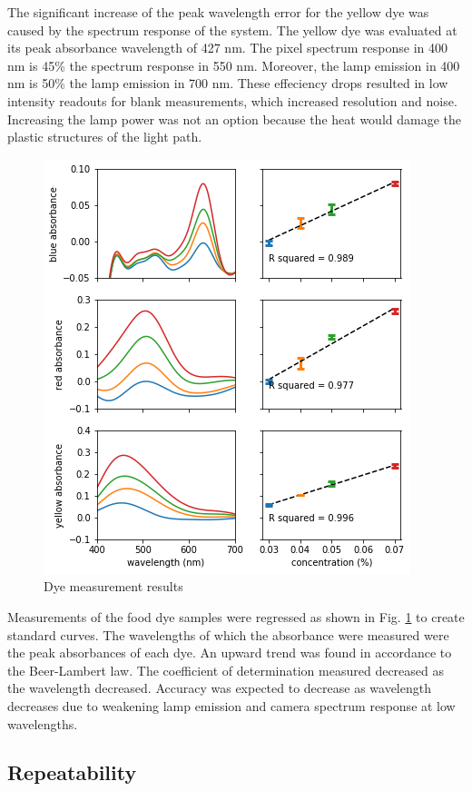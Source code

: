 \documentclass[conference]{IEEEtran}
\begin{document}
The significant increase of the peak wavelength error for the yellow dye was caused by the spectrum response of the system.
The yellow dye was evaluated at its peak absorbance wavelength of 427 nm.
The pixel spectrum response in 400 nm is 45\% the spectrum response in 550 nm.
Moreover, the lamp emission in 400 nm is 50\% the lamp emission in 700 nm.
These effeciency drops resulted in low intensity readouts for blank measurements, which increased resolution and noise.
Increasing the lamp power was not an option because the heat would damage the plastic structures of the light path. 

\begin{figure}[htbp]
    \centerline{\includegraphics[scale=0.6]{dye-res.png}}

    \caption{Dye measurement results}
    \label{dye_res}
    \end{figure}

Measurements of the food dye samples were regressed as shown in Fig. \ref{dye_res} to create standard curves.
The wavelengths of which the absorbance were measured were the peak absorbances of each dye.
An upward trend was found in accordance to the Beer-Lambert law.
The coefficient of determination measured decreased as the wavelength decreased.
Accuracy was expected to decrease as wavelength decreases due to weakening lamp emission and camera spectrum response at low wavelengths.

\subsection{Repeatability}
\end{document}
